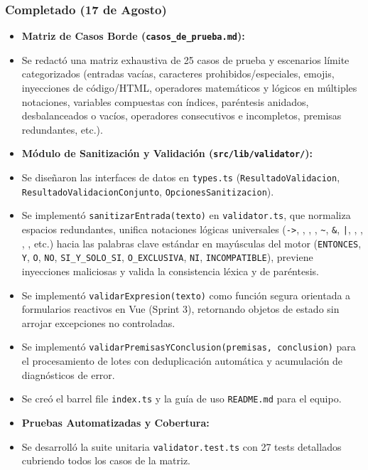 \documentclass[11pt,a4paper,openany]{book}
\begin{document}
\subsubsection{Completado (17 de Agosto)}
\begin{itemize}[leftmargin=*]
\item \textbf{Matriz de Casos Borde (\texttt{casos\_de\_prueba.md}):}
\item Se redactó una matriz exhaustiva de 25 casos de prueba y escenarios límite categorizados (entradas vacías, caracteres prohibidos/especiales, emojis, inyecciones de código/HTML, operadores matemáticos y lógicos en múltiples notaciones, variables compuestas con índices, paréntesis anidados, desbalanceados o vacíos, operadores consecutivos e incompletos, premisas redundantes, etc.).
\item \textbf{Módulo de Sanitización y Validación (\texttt{src/lib/validator/}):}
\item Se diseñaron las interfaces de datos en \texttt{types.ts} (\texttt{ResultadoValidacion}, \texttt{ResultadoValidacionConjunto}, \texttt{OpcionesSanitizacion}).
\item Se implementó \texttt{sanitizarEntrada(texto)} en \texttt{validator.ts}, que normaliza espacios redundantes, unifica notaciones lógicas universales (\texttt{->}, \texttt{}, \texttt{}, \texttt{}, \texttt{\textasciitilde{}}, \texttt{\&}, \texttt{|}, \texttt{}, \texttt{}, \texttt{}, \texttt{}, etc.) hacia las palabras clave estándar en mayúsculas del motor (\texttt{ENTONCES}, \texttt{Y}, \texttt{O}, \texttt{NO}, \texttt{SI\_Y\_SOLO\_SI}, \texttt{O\_EXCLUSIVA}, \texttt{NI}, \texttt{INCOMPATIBLE}), previene inyecciones maliciosas y valida la consistencia léxica y de paréntesis.
\item Se implementó \texttt{validarExpresion(texto)} como función segura orientada a formularios reactivos en Vue (Sprint 3), retornando objetos de estado sin arrojar excepciones no controladas.
\item Se implementó \texttt{validarPremisasYConclusion(premisas, conclusion)} para el procesamiento de lotes con deduplicación automática y acumulación de diagnósticos de error.
\item Se creó el barrel file \texttt{index.ts} y la guía de uso \texttt{README.md} para el equipo.
\item \textbf{Pruebas Automatizadas y Cobertura:}
\item Se desarrolló la suite unitaria \texttt{validator.test.ts} con 27 tests detallados cubriendo todos los casos de la matriz.

\end{itemize}
\end{document}
